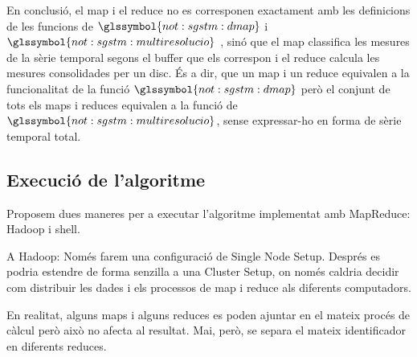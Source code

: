 En conclusió, el map i el reduce no es corresponen exactament
amb les definicions de les funcions de $\glssymbol{not:sgstm:dmap}$ i
$\glssymbol{not:sgstm:multiresolucio}$ , sinó
que el map classifica les mesures de la sèrie temporal segons el
buffer que els correspon i el reduce calcula les mesures consolidades
per un disc. És a dir, que un map i un reduce equivalen a la
funcionalitat de la funció $\glssymbol{not:sgstm:dmap}$ però el
conjunt de tots els maps i reduces equivalen a la funció de
$\glssymbol{not:sgstm:multiresolucio}$, sense expressar-ho en forma de
sèrie temporal total.







\subsection{Execució de l'algoritme}

Proposem dues maneres per a executar l'algoritme implementat amb
MapReduce: Hadoop i shell.  


A Hadoop:\todo{}
Només farem una configuració de Single Node Setup. 
Després es podria estendre de forma senzilla a una Cluster Setup, on
només caldria decidir com distribuir les dades i els processos de map
i reduce als diferents computadors.

\todo{} En realitat, alguns maps i alguns reduces es poden ajuntar en
el mateix procés de càlcul però això no afecta al resultat. Mai, però,
se separa el mateix identificador en diferents reduces.


